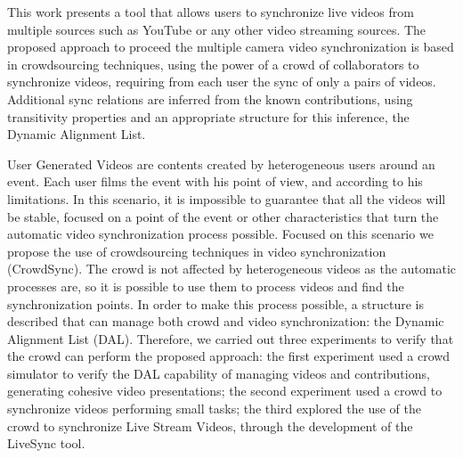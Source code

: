 This work presents a tool that allows users to synchronize live videos from multiple sources such as YouTube or any other video streaming sources. The proposed approach to proceed the multiple camera video synchronization is based in crowdsourcing techniques, using the power of a crowd of collaborators to synchronize videos, requiring from each user the sync of only a pairs of videos. Additional sync relations are inferred from the known contributions, using transitivity properties and an appropriate structure for this inference, the Dynamic Alignment List.



User Generated Videos are contents created by heterogeneous users around an event. Each user films the event with his point of view, and according to his limitations. In this scenario, it is impossible to guarantee that all the videos will be stable, focused on a point of the event or other characteristics that turn the automatic video synchronization process possible. Focused on this scenario we propose the use of crowdsourcing techniques in video synchronization (CrowdSync). The crowd is not affected by heterogeneous videos as the automatic processes are, so it is possible to use them to process videos and find the synchronization points.  In order to make this process possible, a structure is described that can manage both crowd and video synchronization: the Dynamic Alignment List (DAL). Therefore, we carried out three experiments to verify that the crowd can perform the proposed approach: the first experiment used a crowd simulator to verify the DAL capability of managing videos and contributions, generating cohesive video presentations; the second experiment used a crowd to synchronize videos performing small tasks; the third explored the use of the crowd to synchronize Live Stream Videos, through the development of the LiveSync tool.